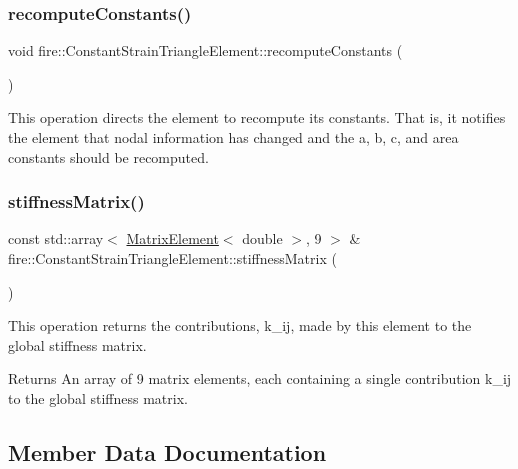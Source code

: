 \subsubsection{\texorpdfstring{recompute\+Constants()}{recomputeConstants()}}
{\footnotesize\ttfamily void fire\+::\+Constant\+Strain\+Triangle\+Element\+::recompute\+Constants (\begin{DoxyParamCaption}{ }\end{DoxyParamCaption})}

This operation directs the element to recompute its constants. That is, it notifies the element that nodal information has changed and the a, b, c, and area constants should be recomputed. \mbox{\label{a00764_a6da0892a84128d73e1186aeb69a37723}} 
\subsubsection{\texorpdfstring{stiffness\+Matrix()}{stiffnessMatrix()}}
{\footnotesize\ttfamily const std\+::array$<$ \hyperlink{a00189_a1a12603621e7a1efa59ac5cb79f9d509}{Matrix\+Element}$<$ double $>$, 9 $>$ \& fire\+::\+Constant\+Strain\+Triangle\+Element\+::stiffness\+Matrix (\begin{DoxyParamCaption}{ }\end{DoxyParamCaption})}

This operation returns the contributions, k\+\_\+ij, made by this element to the global stiffness matrix. \begin{DoxyReturn}{Returns}
An array of 9 matrix elements, each containing a single contribution k\+\_\+ij to the global stiffness matrix. 
\end{DoxyReturn}


\subsection{Member Data Documentation}
\mbox{\label{a00764_af5cd851c5a4385f954bfc31b8eca81be}} 
